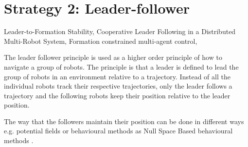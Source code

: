 \section{Strategy 2: Leader-follower}
Leader-to-Formation Stability,
Cooperative Leader Following in a Distributed Multi-Robot System,
Formation constrained multi-agent control, 

The leader follower principle is used as a higher order principle of how to navigate a group of robots. The principle is that a leader is defined to lead the group of robots in an environment relative to a trajectory. Instead of all the individual robots track their respective trajectories, only the leader follows a trajectory and the following robots keep their position relative to the leader position.

The way that the followers maintain their position can be done in different ways e.g. potential fields \citep{pfmrm} or behavioural methods as Null Space Based behavioural methods \citep{arrichiello2006formation}.